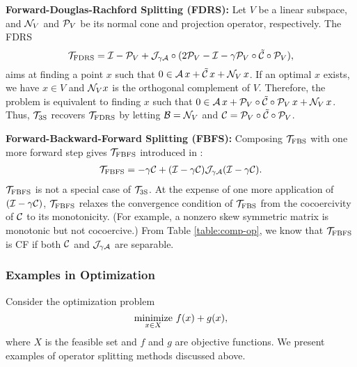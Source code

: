 {\textbf{Forward-Douglas-Rachford Splitting (FDRS):} Let $V$ be  a linear subspace, and ${\mathcal{N}}_V$ and ${\mathcal{P}}_V$ be its normal cone and projection operator, respectively. The FDRS~\cite{briceno2015FDRS}
 $${{\mathcal{T}}_{\mathrm{FDRS}}}={\mathcal{I}}-{\mathcal{P}}_V+{\mathcal{J}}_{\gamma{\mathcal{A}}}\circ(2{\mathcal{P}}_V-{\mathcal{I}}-\gamma {\mathcal{P}}_V\circ\tilde{{\mathcal{C}}}\circ{\mathcal{P}}_V),$$
aims at finding a point $x$ such that $0\in{\mathcal{A}}\,x+\tilde{{\mathcal{C}}}\,x+{\mathcal{N}}_V\,x$. If an optimal $x$ exists, we have $x\in V$ and ${\mathcal{N}}_Vx$ is the orthogonal complement of $V$. Therefore, the problem is equivalent to finding $x$ such that $0\in{\mathcal{A}}\,x+{\mathcal{P}}_V\circ\tilde{{\mathcal{C}}}\circ{\mathcal{P}}_V\,x+{\mathcal{N}}_V\,x$. Thus, ${{\mathcal{T}}_{\mathrm{3S}}}$ recovers ${{\mathcal{T}}_{\mathrm{FDRS}}}$ by letting ${\mathcal{B}}={\mathcal{N}}_V$ and ${\mathcal{C}}={\mathcal{P}}_V\circ\tilde{{\mathcal{C}}}\circ{\mathcal{P}}_V$.

\textbf{Forward-Backward-Forward Splitting (FBFS):} Composing ${{\mathcal{T}}_{\mathrm{FBS}}}$ with one more forward step gives ${{\mathcal{T}}_{\mathrm{FBFS}}}$ introduced in \cite{FBF_Tseng}:
\begin{align}\label{eqn:fbf}
\TFBFS = -\gamma \cC  + (\cI-\gamma \cC)\cJ_{\gamma \cA}(\cI-\gamma \cC).
\end{align} %
${{\mathcal{T}}_{\mathrm{FBFS}}}$ is not  a special case of ${{\mathcal{T}}_{\mathrm{3S}}}$. At the expense of one more application of $({\mathcal{I}}-\gamma {\mathcal{C}})$, ${{\mathcal{T}}_{\mathrm{FBFS}}}$ relaxes the convergence condition  of ${{\mathcal{T}}_{\mathrm{FBS}}}$ from  the cocoercivity of ${\mathcal{C}}$ {to its monotonicity. (For example, a nonzero skew symmetric matrix is monotonic but not cocoercive.)}
From Table \ref{table:comp-op}, we know that ${{\mathcal{T}}_{\mathrm{FBFS}}}$ is CF if both ${\mathcal{C}}$ and ${\mathcal{J}}_{\gamma {\mathcal{A}}}$ are separable.

\subsubsection{Examples in Optimization}
Consider the optimization problem
\begin{equation}\label{eq:opt-example}
\Min_{x\in X}\, f(x)+g(x),
\end{equation}
where $X$ is the feasible set and $f$ and $g$ are objective functions. We present examples of operator splitting methods discussed above.


}

